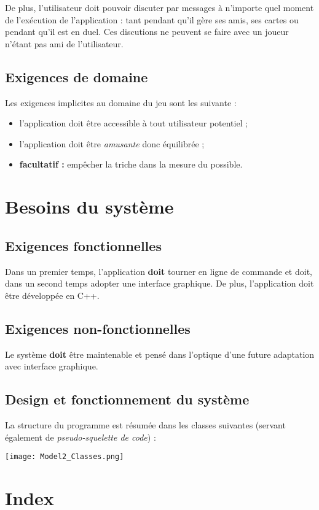 \documentclass{article}
\begin{document}
        De plus, l'utilisateur doit pouvoir discuter par messages à n'importe quel moment de l'exécution de l'application : tant pendant
        qu'il gère ses amis, ses cartes ou pendant qu'il est en \gls{duel}. Ces discutions ne peuvent se faire avec un joueur
        n'étant pas ami de l'utilisateur.

    \subsection{Exigences de domaine}
        Les exigences implicites au domaine du jeu sont les suivante :

        \begin{itemize}
            \item l'application doit être accessible à tout utilisateur potentiel ;
            \item l'application doit être \textit{amusante} donc équilibrée ;
            \item \textbf{\gls{facultatif} : } empêcher la triche dans la mesure du possible.
        \end{itemize}

\section{Besoins du système}
    \subsection{Exigences fonctionnelles}
        Dans un premier temps, l'application \textbf{doit} tourner en ligne de commande et doit, dans un second temps adopter une interface
        graphique. De plus, l'application doit être développée en C++.

    \subsection{Exigences non-fonctionnelles}
        Le système \textbf{doit} être maintenable et pensé dans l'optique d'une future adaptation avec interface graphique.

    \subsection{Design et fonctionnement du système}
        La structure du programme est résumée dans les classes suivantes (servant également de \textit{pseudo-squelette de code}) :

        \begin{center}\texttt{[image: Model2\_Classes.png]}\end{center}

\section{Index}
        \printglossary[type=glossary, style=Index, title=]
\end{document}

